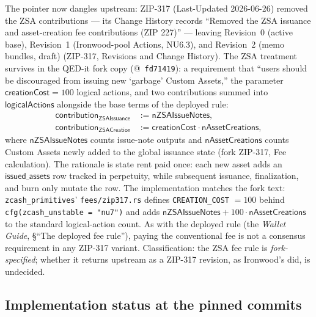 \documentclass[11pt,a4paper]{article}
\theoremstyle{definition}
\begin{document}
The pointer now dangles upstream: ZIP-317 (Last-Updated 2026-06-26) removed
the ZSA contributions --- its Change History records ``Removed the ZSA
issuance and asset-creation fee contributions (ZIP 227)'' --- leaving
Revision~0 (active base), Revision~1 (Ironwood-pool Actions, NU6.3), and
Revision~2 (memo bundles, draft) (ZIP-317, Revisions and Change History).
The ZSA treatment survives in the QED-it fork copy
(@~\texttt{fd71419}): a requirement that ``users should be discouraged from
issuing new `garbage' Custom Assets,'' the parameter
$\mathsf{creationCost} = 100$ logical actions, and two contributions summed
into $\mathsf{logicalActions}$ alongside the base terms of the deployed
rule:
\begin{align*}
\mathsf{contribution}_{\mathsf{ZSAIssuance}} &:= \mathsf{nZSAIssueNotes},\\
\mathsf{contribution}_{\mathsf{ZSACreation}} &:= \mathsf{creationCost}
\cdot \mathsf{nAssetCreations},
\end{align*}
where $\mathsf{nZSAIssueNotes}$ counts issue-note outputs and
$\mathsf{nAssetCreations}$ counts Custom Assets newly added to the global
issuance state (fork ZIP-317, Fee calculation). The rationale is state rent
paid once: each new asset adds an $\mathsf{issued\_assets}$ row tracked in
perpetuity, while subsequent issuance, finalization, and burn only mutate
the row. The implementation matches the fork text:
\texttt{zcash\_primitives}' \texttt{fees/zip317.rs} defines
\texttt{CREATION\_COST} $= 100$ behind
\texttt{cfg(zcash\_unstable = "nu7")} and adds
$\mathsf{nZSAIssueNotes} + 100 \cdot \mathsf{nAssetCreations}$ to the
standard logical-action count. As with the deployed rule (the \emph{Wallet
Guide}, \S``The deployed fee rule''), paying the conventional fee is not a
consensus requirement in any ZIP-317 variant. Classification: the ZSA fee
rule is \emph{fork-specified}; whether it returns upstream as a ZIP-317
revision, as Ironwood's did, is undecided.

\subsection{Implementation status at the pinned commits}\label{sec:zsa-impl}
\end{document}

